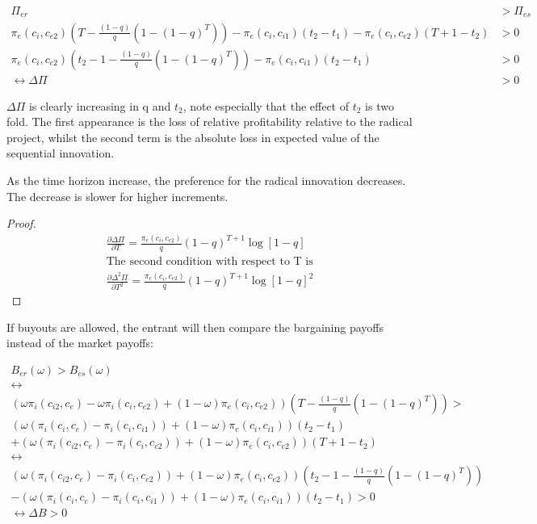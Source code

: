 \begin{align*}
\Pi_{er}  &> \Pi_{es}   \\
\pi_{e}(c_i,c_{e2}) \left( T - \frac{(1-q)}{q} \left( 1-(1-q)^T \right) \right) - \pi_e(c_i,c_{i1}) (t_2-t_1) -\pi_e(c_i,c_{e2})(T+1-t_2) &> 0 \\
\pi_{e}(c_i,c_{e2}) \left( t_2 -1- \frac{(1-q)}{q} \left( 1-(1-q)^T \right) \right) - \pi_e(c_i,c_{i1}) (t_2-t_1)  &> 0 \\
\leftrightarrow
\Delta \Pi &> 0
\end{align*}

$\Delta \Pi$ is clearly increasing in q and $t_2$, note especially that the effect of $t_2$ is two fold. The first appearance is the loss of relative profitability relative to the radical project, whilst the second term is the absolute loss in expected value of the sequential innovation. 

\begin{proposition}
As the time horizon increase, the preference for the radical innovation decreases. The decrease is slower for higher increments. 
\end{proposition}

\begin{proof}
\begin{align*}
\frac{\partial \Delta \Pi}{\partial T}=\frac{\pi_{e}(c_i,c_{e2})}{q} (1-q)^{T+1} \log[1-q] \\
\text{The second condition with respect to T is} \\
\frac{\partial \Delta^2 \Pi}{\partial T^2} = \frac{\pi_{e}(c_i,c_{e2})}{q} (1-q)^{T+1} \log[1-q]^2
\end{align*}
\end{proof}

If buyouts are allowed, the entrant will then compare the bargaining payoffs instead of the market payoffs: 

\begin{align*}
B_{er}(\omega) > B_{es}(\omega) \\
\leftrightarrow \\
\left(\omega\pi_{i}(c_{i2},c_{e})-\omega \pi_{i}(c_{i},c_{e2})+(1-\omega)\pi_{e}(c_{i},c_{e2}) \right) \left( T - \frac{(1-q)}{q} \left( 1-(1-q)^T \right) \right)> \\ 
(\omega(\pi_i(c_i,c_{e})-\pi_i(c_i,c_{i1}))+(1-\omega)\pi_e(c_i,c_{i1}))(t_2-t_1) \\
+(\omega(\pi_i(c_{i2},c_e)- \pi_i(c_{i},c_{e2}))+(1-\omega)\pi_e(c_{i},c_{e2}))(T+1-t_2) \\
\leftrightarrow \\
\left(\omega (\pi_{i}(c_{i2},c_{e})- \pi_{i}(c_{i},c_{e2}))+(1-\omega)\pi_{e}(c_{i},c_{e2}) \right) \left( t_2-1 - \frac{(1-q)}{q} \left( 1-(1-q)^T \right) \right)  \\
-(\omega(\pi_i(c_i,c_{e})-\pi_i(c_i,c_{i1}))+(1-\omega)\pi_e(c_i,c_{i1}))(t_2-t_1)>0 \\
\leftrightarrow
\Delta B > 0
\end{align*}

